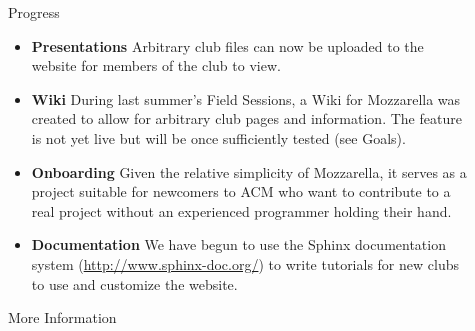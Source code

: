 \documentclass[final]{beamer}
\newlength{\sepwid}
\newlength{\onecolwid}
\begin{document}
\begin{frame}[t]
\begin{columns}[t]
\begin{column}{\onecolwid}
            \end{column} %

            \begin{column}{\sepwid}\end{column} %

            \begin{column}{\onecolwid} %

                \begin{block}{Progress}
                    \setlength{\parskip}{0.5em}

		    \begin{itemize}
			\item \textbf{Presentations} Arbitrary club files can
                        now be uploaded to the website for members of the club
                        to view.
			\item \textbf{Wiki} During last summer's Field Sessions,
                        a Wiki for Mozzarella was created to allow for arbitrary
                        club pages and information. The feature is not yet live
                        but will be once sufficiently tested (see Goals).
			\item \textbf{Onboarding} Given the relative simplicity
                        of Mozzarella, it serves as a project suitable for
                        newcomers to ACM who want to contribute to a real
                        project without an experienced programmer holding their
                        hand.
			\item \textbf{Documentation} We have begun to use the
                        Sphinx documentation system
                        (\href{http://www.sphinx-doc.org/}{http://www.sphinx-doc.org/})
                        to write tutorials for new clubs to use and customize
                        the website.
		    \end{itemize}

                \end{block}


                \begin{alertblock}{More Information}

                    \begin{enumerate}[leftmargin=11.5cm, labelsep=1cm]


\end{enumerate}
\end{alertblock}
\end{column}
\end{columns}
\end{frame}
\end{document}
